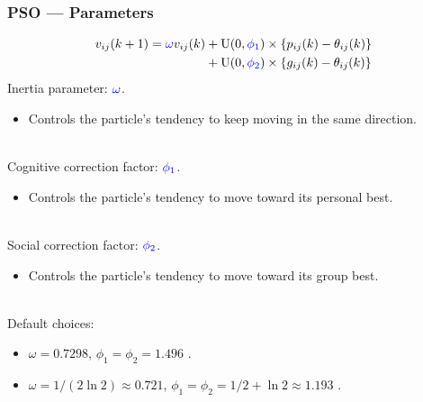 \documentclass[xcolor=dvipsnames]{beamer}
\begin{document}
\begin{frame}
\frametitle{PSO --- Parameters}
\begin{align*}
v_{ij}(k+1) &= {\color{blue}\omega} v_{ij}(k) +  \mathrm{U}(0,{\color{blue}\phi_1})\times\{p_{ij}(k) - \theta_{ij}(k)\} \\
     &\;\phantom{= \omega v_{ij}(k)}+  \mathrm{U}(0,{\color{blue}\phi_2})\times\{g_{ij}(k) - \theta_{ij}(k)\}
\end{align*}
{\color{blue}Inertia} parameter: ${\color{blue}\omega}$.
\begin{itemize}
\item Controls the particle's tendency to keep moving in the same direction.\\~\\
\end{itemize}

{\color{blue}Cognitive} correction factor: ${\color{blue}\phi_1}$.
\begin{itemize}
\item Controls the particle's tendency to move toward its personal best.\\~\\
\end{itemize}

{\color{blue}Social} correction factor: ${\color{blue}\phi_2}$.
\begin{itemize}
\item Controls the particle's tendency to move toward its group best.\\~\\
\end{itemize}

Default choices:
\begin{itemize}
\item $\omega = 0.7298$, $\phi_1 = \phi_2 = 1.496$ \citep{clerc2002particle}.
\item $\omega = 1/(2\ln 2)\approx 0.721$, $\phi_1=\phi_2=1/2 + \ln 2\approx 1.193$ \citep{clerc2006stagnation}.
\end{itemize}

\end{frame}
\end{document}
